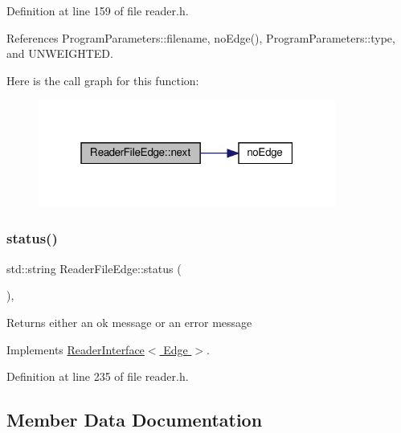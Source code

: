 Definition at line 159 of file reader.\+h.



References Program\+Parameters\+::filename, no\+Edge(), Program\+Parameters\+::type, and U\+N\+W\+E\+I\+G\+H\+T\+ED.

Here is the call graph for this function\+:
\nopagebreak
\begin{figure}[H]
\begin{center}
\leavevmode
\includegraphics[width=277pt]{classReaderFileEdge_a97f967287fdf7f4804139ba9d123494c_cgraph}
\end{center}
\end{figure}
\mbox{\label{classReaderFileEdge_a05205d129f4f59c5cbd4e7a2dcb3d0c1}} 
\subsubsection{\texorpdfstring{status()}{status()}}
{\footnotesize\ttfamily std\+::string Reader\+File\+Edge\+::status (\begin{DoxyParamCaption}{ }\end{DoxyParamCaption})\hspace{0.3cm}{\ttfamily [inline]}, {\ttfamily [virtual]}}

\begin{DoxyReturn}{Returns}
either an ok message or an error message 
\end{DoxyReturn}


Implements \hyperlink{classReaderInterface_a5f86ed49eac808ed0a912f7d670c4042}{Reader\+Interface$<$ Edge $>$}.



Definition at line 235 of file reader.\+h.



\subsection{Member Data Documentation}
\mbox{\label{classReaderFileEdge_a0880f77cf8a5d28e6cea35e30abb3388}} 

